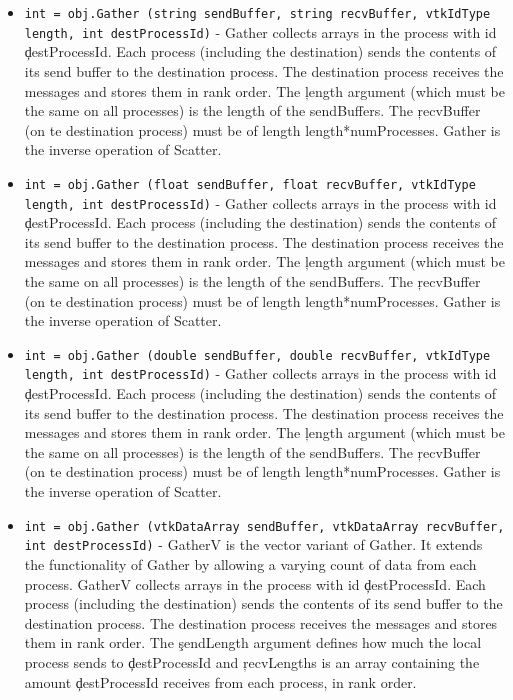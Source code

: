\begin{itemize}
\item  \verb|int = obj.Gather (string sendBuffer, string recvBuffer, vtkIdType length, int destProcessId)| -  Gather collects arrays in the process with id \c destProcessId.  Each
 process (including the destination) sends the contents of its send buffer
 to the destination process.  The destination process receives the
 messages and stores them in rank order.  The \c length argument
 (which must be the same on all processes) is the length of the
 sendBuffers.  The \c recvBuffer (on te destination process) must be of
 length length*numProcesses.  Gather is the inverse operation of Scatter.

\item  \verb|int = obj.Gather (float sendBuffer, float recvBuffer, vtkIdType length, int destProcessId)| -  Gather collects arrays in the process with id \c destProcessId.  Each
 process (including the destination) sends the contents of its send buffer
 to the destination process.  The destination process receives the
 messages and stores them in rank order.  The \c length argument
 (which must be the same on all processes) is the length of the
 sendBuffers.  The \c recvBuffer (on te destination process) must be of
 length length*numProcesses.  Gather is the inverse operation of Scatter.

\item  \verb|int = obj.Gather (double sendBuffer, double recvBuffer, vtkIdType length, int destProcessId)| -  Gather collects arrays in the process with id \c destProcessId.  Each
 process (including the destination) sends the contents of its send buffer
 to the destination process.  The destination process receives the
 messages and stores them in rank order.  The \c length argument
 (which must be the same on all processes) is the length of the
 sendBuffers.  The \c recvBuffer (on te destination process) must be of
 length length*numProcesses.  Gather is the inverse operation of Scatter.

\item  \verb|int = obj.Gather (vtkDataArray sendBuffer, vtkDataArray recvBuffer, int destProcessId)| -  GatherV is the vector variant of Gather.  It extends the functionality of
 Gather by allowing a varying count of data from each process.
 GatherV collects arrays in the process with id \c destProcessId.  Each
 process (including the destination) sends the contents of its send buffer
 to the destination process.  The destination process receives the
 messages and stores them in rank order.  The \c sendLength argument
 defines how much the local process sends to \c destProcessId and
 \c recvLengths is an array containing the amount \c destProcessId
 receives from each process, in rank order.


\end{itemize}
